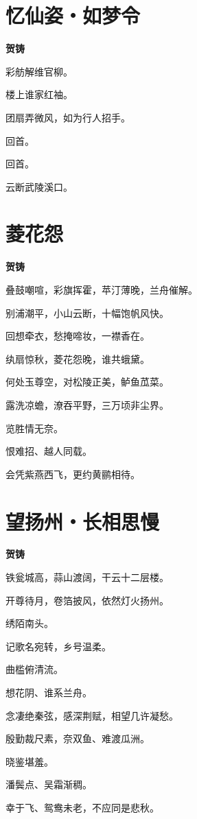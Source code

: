\documentclass[12pt,a4paper]{ctexbook}
\begin{document}
\section{忆仙姿・如梦令}
\textbf{贺铸}\par\vspace{0.5em}
彩舫解维官柳。\par
楼上谁家红袖。\par
团扇弄微风，如为行人招手。\par
回首。\par
回首。\par
云断武陵溪口。\par

\section{菱花怨}
\textbf{贺铸}\par\vspace{0.5em}
叠鼓嘲喧，彩旗挥霍，苹汀薄晚，兰舟催解。\par
别浦潮平，小山云断，十幅饱帆风快。\par
回想牵衣，愁掩啼妆，一襟香在。\par
纨扇惊秋，菱花怨晚，谁共蛾黛。\par
何处玉尊空，对松陵正美，鲈鱼苽菜。\par
露洗凉蟾，潦吞平野，三万顷非尘界。\par
览胜情无奈。\par
恨难招、越人同载。\par
会凭紫燕西飞，更约黄鹂相待。\par

\section{望扬州・长相思慢}
\textbf{贺铸}\par\vspace{0.5em}
铁瓮城高，蒜山渡阔，干云十二层楼。\par
开尊待月，卷箔披风，依然灯火扬州。\par
绣陌南头。\par
记歌名宛转，乡号温柔。\par
曲槛俯清流。\par
想花阴、谁系兰舟。\par
念凄绝秦弦，感深荆赋，相望几许凝愁。\par
殷勤裁尺素，奈双鱼、难渡瓜洲。\par
晓鉴堪羞。\par
潘鬓点、吴霜渐稠。\par
幸于飞、鸳鸯未老，不应同是悲秋。\par
\end{document}
